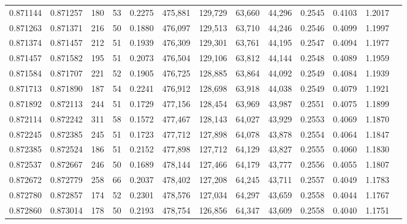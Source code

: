 \begin{tabular}{rrrrrrrrrrrrr}
0.871144 & 0.871257 &   180 &  53 &                                     0.2275 & 475,881 & 129,729 &  63,660 &  44,296 & 0.2545 & 0.4103 & 1.2017 \\
0.871263 & 0.871371 &   216 &  50 &                                     0.1880 & 476,097 & 129,513 &  63,710 &  44,246 & 0.2546 & 0.4099 & 1.1997 \\
0.871374 & 0.871457 &   212 &  51 &                                     0.1939 & 476,309 & 129,301 &  63,761 &  44,195 & 0.2547 & 0.4094 & 1.1977 \\
0.871457 & 0.871582 &   195 &  51 &                                     0.2073 & 476,504 & 129,106 &  63,812 &  44,144 & 0.2548 & 0.4089 & 1.1959 \\
0.871584 & 0.871707 &   221 &  52 &                                     0.1905 & 476,725 & 128,885 &  63,864 &  44,092 & 0.2549 & 0.4084 & 1.1939 \\
0.871713 & 0.871890 &   187 &  54 &                                     0.2241 & 476,912 & 128,698 &  63,918 &  44,038 & 0.2549 & 0.4079 & 1.1921 \\
0.871892 & 0.872113 &   244 &  51 &                                     0.1729 & 477,156 & 128,454 &  63,969 &  43,987 & 0.2551 & 0.4075 & 1.1899 \\
0.872114 & 0.872242 &   311 &  58 &                                     0.1572 & 477,467 & 128,143 &  64,027 &  43,929 & 0.2553 & 0.4069 & 1.1870 \\
0.872245 & 0.872385 &   245 &  51 &                                     0.1723 & 477,712 & 127,898 &  64,078 &  43,878 & 0.2554 & 0.4064 & 1.1847 \\
0.872385 & 0.872524 &   186 &  51 &                                     0.2152 & 477,898 & 127,712 &  64,129 &  43,827 & 0.2555 & 0.4060 & 1.1830 \\
0.872537 & 0.872667 &   246 &  50 &                                     0.1689 & 478,144 & 127,466 &  64,179 &  43,777 & 0.2556 & 0.4055 & 1.1807 \\
0.872672 & 0.872779 &   258 &  66 &                                     0.2037 & 478,402 & 127,208 &  64,245 &  43,711 & 0.2557 & 0.4049 & 1.1783 \\
0.872780 & 0.872857 &   174 &  52 &                                     0.2301 & 478,576 & 127,034 &  64,297 &  43,659 & 0.2558 & 0.4044 & 1.1767 \\
0.872860 & 0.873014 &   178 &  50 &                                     0.2193 & 478,754 & 126,856 &  64,347 &  43,609 & 0.2558 & 0.4040 & 1.1751 \\

\end{tabular}
